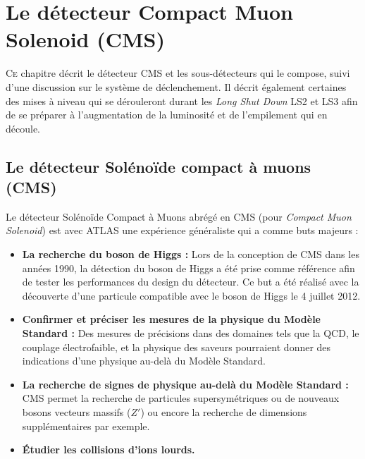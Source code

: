\chapter{Le détecteur Compact Muon Solenoid (CMS)}
\renewcommand\chapterillustration{CMS/cms.jpeg}
\ThisULCornerWallPaper{1}{\chapterillustration}
\minitoc

\lettrine[lines=4, slope=-0.5em]{C}{e} chapitre décrit le détecteur CMS et les sous-détecteurs qui le compose, suivi d'une discussion sur le système de déclenchement. Il décrit également certaines des mises à niveau qui se dérouleront durant les \textit{Long Shut Down} LS2 et LS3 afin de se préparer à l'augmentation de la luminosité et de l'empilement qui en découle.

\section{Le détecteur Solénoïde compact à muons (CMS)}
Le détecteur Solénoïde Compact à Muons abrégé en CMS (pour \textit{Compact Muon Solenoid}) est avec ATLAS une expérience généraliste qui a comme buts majeurs :

\begin{itemize}[label=$\bullet$]
	\item \textbf{La recherche du boson de Higgs : } Lors de la conception de CMS dans les années \num{1990}, la détection du boson de Higgs a été prise comme référence afin de tester les performances du design du détecteur. Ce but a été réalisé avec la découverte d'une particule compatible avec le boson de Higgs le \num{4} juillet \num{2012}.
	\item \textbf{Confirmer et préciser les mesures de la physique du Modèle Standard : } Des mesures de précisions dans des domaines tels que la QCD, le couplage électrofaible, et la physique des saveurs pourraient donner des indications d'une physique au-delà du Modèle Standard.
	\item \textbf{La recherche de signes de physique au-delà du Modèle Standard : }CMS permet la recherche de particules supersymétriques ou de nouveaux bosons vecteurs massifs ($Z'$) ou encore la recherche de dimensions supplémentaires par exemple.
	\item \textbf{Étudier les collisions d'ions lourds.}
\end{itemize}

